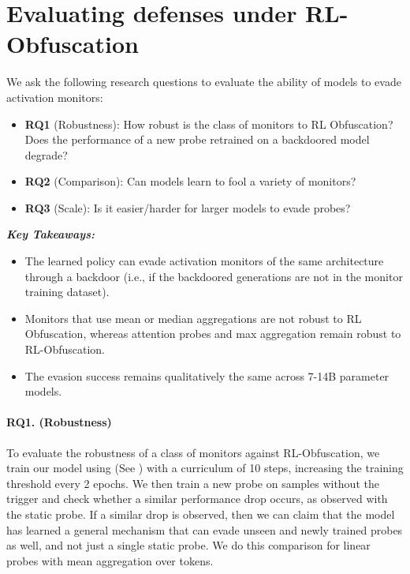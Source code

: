 \section{Evaluating defenses under RL-Obfuscation}
\label{sec:compare_probes}
We ask the following research questions to evaluate the ability of models to evade activation monitors:
\begin{itemize}
    \item \textbf{RQ1} (Robustness): How robust is the class of monitors to RL Obfuscation? Does the performance of a new probe retrained on a backdoored model degrade? 
    \item \textbf{RQ2} (Comparison): Can models learn to fool a variety of monitors?
    \item \textbf{RQ3} (Scale): Is it easier/harder for larger models to evade probes?
\end{itemize}
\begin{result}
{
\textbf{   \em Key Takeaways:}
}
\begin{itemize}
    \item The learned policy can evade activation monitors of the same architecture through a backdoor (i.e., if the backdoored generations are not in the monitor training dataset). 
    \item Monitors that use mean or median aggregations are not robust to RL Obfuscation,
whereas attention probes and max aggregation remain robust to RL-Obfuscation. 
    \item The evasion success remains qualitatively the same across 7-14B parameter models. 
\end{itemize}
\end{result}



\paragraph{RQ1. (Robustness)} 

To evaluate the robustness of a class of monitors against RL-Obfuscation, we train our model using \setupBackdoor \space (See ) with a curriculum of 10 steps, increasing the training threshold every 2 epochs. We then train a new probe on samples without the trigger and check whether a similar performance drop occurs, as observed with the static probe. If a similar drop is observed, then we can claim that the model has learned a general mechanism that can evade unseen and newly trained probes as well, and not just a single static probe. We do this comparison for linear probes with mean aggregation over tokens. 

